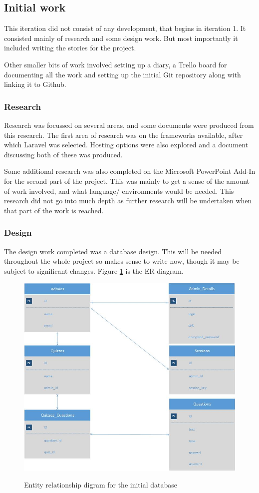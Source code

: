 \subsection{Initial work}
This iteration did not consist of any development, that begins in iteration 1. It consisted mainly of research and some design work. But most importantly it included writing the stories for the project. 

Other smaller bits of work involved setting up a diary, a Trello board for documenting all the work and setting up the initial Git repository along with linking it to Github.
\subsubsection{Research}
Research was focussed on several areas, and some documents were produced from this research. The first area of research was on the frameworks available, after which Laravel was selected. Hosting options were also explored and a document discussing both of these was produced.

Some additional research was also completed on the Microsoft PowerPoint Add-In for the second part of the project. This was mainly to get a sense of the amount of work involved, and what language/ environments would be needed. This research did not go into much depth as further research will be undertaken when that part of the work is reached.
\subsubsection{Design}
The design work completed was a database design. This will be needed throughout the whole project so makes sense to write now, though it may be subject to significant changes. Figure \ref{fig:initial-er-diagram} is the ER diagram.

\begin{figure}
	\caption{Entity relationship digram for the initial database}
	\includegraphics[width=\textwidth]{Chapter2/Iter-0/Initial-ERDiagram}
	\label{fig:initial-er-diagram}
\end{figure}

